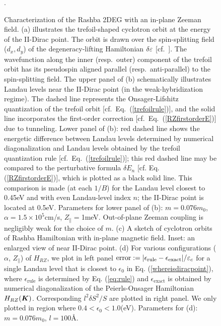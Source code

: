 \documentclass[aps, prb, showpacs, twocolumn, notitlepage, superscriptaddress]{revtex4-1}
\begin{document}
\begin{figure}
\caption{Characterization of the Rashba 2DEG with an in-plane Zeeman field. (a) illustrates the trefoil-shaped cyclotron orbit at the energy of the II-Dirac point. The orbit is drawn over the  spin-splitting field ($d_x,d_y$) of the degeneracy-lifting Hamiltonian $\delta\varepsilon$ [cf.\ ]. The wavefunction along the inner (resp.\ outer) component of the trefoil orbit has its pseudospin aligned parallel (resp.\ anti-parallel) to the spin-splitting field. The upper panel of (b) schematically illustrates  Landau levels near the II-Dirac point (in the weak-hybridization regime). The dashed line represents the Onsager-Lifshitz quantization of the trefoil orbit [cf.\ Eq.\ (\ref{trefoilrule})], and the solid line incorporates the first-order correction [cf.\ Eq.\ (\ref{RZfirstorderE})] due to tunneling. Lower panel of (b): red dashed line shows the energetic difference between Landau levels determined by numerical diagonalization and Landau levels obtained by the trefoil quantization rule  [cf.\ Eq.\ (\ref{trefoilrule})]; this red dashed line may be compared to the perturbative formula $\delta E_n$ [cf. Eq. (\ref{RZfirstorderE})], which is plotted as a black solid line.  This comparison is made (at each $1/B$) for the Landau level closest to 0.45eV and with even Landau-level index $n$; the II-Dirac point is located at 0.5eV.  Parameters for lower panel of (b): $m{=}0.076m_0$, $\alpha{=} 1.5\times10^{5}$cm/s, $Z_\parallel {=}$1meV. Out-of-plane Zeeman coupling is negligibly weak for the choice of $m$. (c) A sketch of cyclotron orbits of Rashba Hamiltonian with in-plane magnetic field. Inset: an enlarged view of near II-Dirac point. (d) For various configurations ($\alpha$, $Z_\parallel$) of $H_{RZ}$, we plot in left panel $\text{error}:=|\epsilon_\text{rule}-\epsilon_\text{exact}|/\varepsilon_c$ for a single Landau level that is closest to $\epsilon_0$ in Eq. (\ref{whereisdiracpoint}), where $\epsilon_\text{rule}$ is determined by Eq. (\ref{eq:rule}) and $\epsilon_{\text{exact}}$ is obtained by numerical diagonalization of the Peierls-Onsager Hamiltonian $H_{RZ}(\boldsymbol{K})$. Corresponding $l^2 \delta S^2/S$ are plotted in right panel. We only plotted in region where $0.4{<}\epsilon_0{<}1.0$(eV)\cite{RZfignote}. Parameters for (d): $m=0.076m_0$, $l=100$\AA. \label{fig:RZ}}.
\end{figure}
\end{document}
